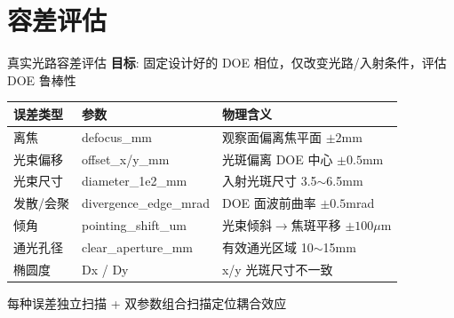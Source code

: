 \documentclass[10pt,aspectratio=43]{beamer}
\begin{document}
\section{容差评估}

\begin{frame}{真实光路容差评估}
  \textbf{目标}: 固定设计好的 DOE 相位，仅改变光路/入射条件，评估 DOE 鲁棒性

  \vspace{0.1cm}
  \begin{table}
    \small
    \begin{tabular}{lll}
      \toprule
      \textbf{误差类型} & \textbf{参数} & \textbf{物理含义} \\
      \midrule
      离焦 & defocus\_mm & 观察面偏离焦平面 $\pm 2$mm \\
      光束偏移 & offset\_x/y\_mm & 光斑偏离 DOE 中心 $\pm 0.5$mm \\
      光束尺寸 & diameter\_1e2\_mm & 入射光斑尺寸 3.5$\sim$6.5mm \\
      发散/会聚 & divergence\_edge\_mrad & DOE 面波前曲率 $\pm 0.5$mrad \\
      倾角 & pointing\_shift\_um & 光束倾斜$\to$焦斑平移 $\pm 100\mu$m \\
      通光孔径 & clear\_aperture\_mm & 有效通光区域 10$\sim$15mm \\
      椭圆度 & Dx / Dy & x/y 光斑尺寸不一致 \\
      \bottomrule
    \end{tabular}
  \end{table}

  \begin{center}
    \tiny 每种误差独立扫描 + 双参数组合扫描定位耦合效应
  \end{center}
\end{frame}
\end{document}
